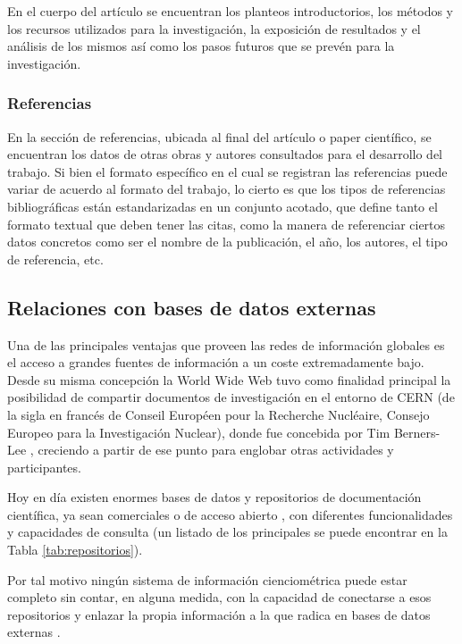 En el cuerpo del artículo se encuentran los planteos introductorios, los métodos y los recursos utilizados para la investigación, la exposición de resultados y el análisis de los mismos así como los pasos futuros que se prevén para la investigación.

\subsubsection{Referencias}

En la sección de referencias, ubicada al final del artículo o paper científico, se encuentran los datos de otras obras y autores consultados para el desarrollo del trabajo. Si bien el formato específico en el cual se registran las referencias puede variar de acuerdo al formato del trabajo, lo cierto es que los tipos de referencias bibliográficas están estandarizadas en un conjunto acotado, que define tanto el formato textual que deben tener las citas, como la manera de referenciar ciertos datos concretos como ser el nombre de la publicación, el año, los autores, el tipo de referencia, etc.

\subsection{Relaciones con bases de datos externas}

Una de las principales ventajas que proveen las redes de información globales es el acceso a grandes fuentes de información a un coste extremadamente bajo. Desde su misma concepción la World Wide Web tuvo como finalidad principal la posibilidad de compartir documentos de investigación en el entorno de CERN (de la sigla en francés de Conseil Européen pour la Recherche Nucléaire, Consejo Europeo para la Investigación Nuclear), donde fue concebida por Tim Berners-Lee \cite{segal1995short}, creciendo a partir de ese punto para englobar otras actividades y participantes.

Hoy en día existen enormes bases de datos y repositorios de documentación científica, ya sean comerciales \cite{bakkalbasi2006three} o de acceso abierto \cite{minniti2018mapping}, con diferentes funcionalidades y capacidades de consulta (un listado de los principales se puede encontrar en la Tabla \ref{tab:repositorios}).

Por tal motivo ningún sistema de información cienciométrica puede estar completo sin contar, en alguna medida, con la capacidad de conectarse a esos repositorios y enlazar la propia información a la que radica en bases de datos externas \cite{garfield2006citation}.

